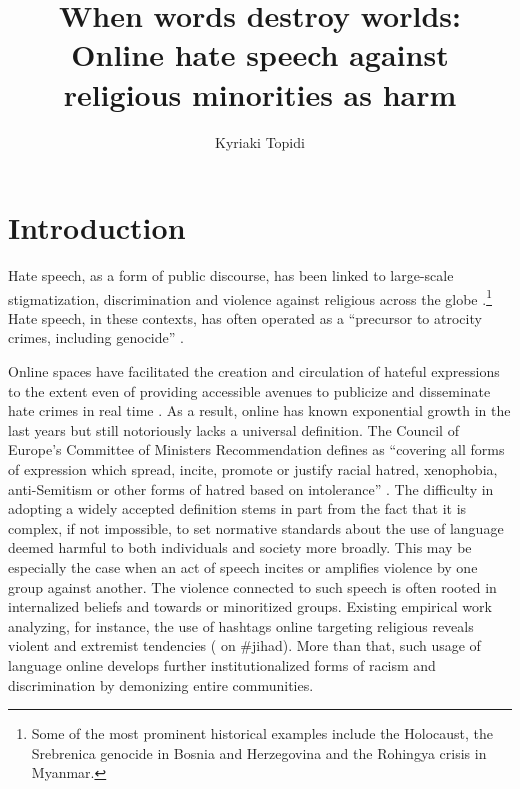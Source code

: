 \documentclass[output=paper,colorlinks,citecolor=brown]{langscibook}
\author{Kyriaki Topidi\orcid{}\affiliation{}}
\title[When words destroy worlds]{When words destroy worlds: Online hate speech against religious minorities as harm}
\begin{document}
\maketitle


\section{Introduction}\label{ch.1.2.ss.1}

Hate speech, as a form of public discourse, has been linked to large-scale stigmatization, discrimination and violence against religious  across the globe \citep{un2023}.\footnote{%
Some of the most prominent historical examples include the Holocaust, the Srebrenica genocide in Bosnia and Herzegovina and the Rohingya crisis in Myanmar.} Hate speech, in these contexts, has often operated as a ``precursor to atrocity crimes, including genocide'' \citep{un2023}.

Online spaces have facilitated the creation and circulation of hateful expressions to the extent even of providing accessible avenues to publicize and disseminate hate crimes in real time \citep{laub2019}. As a result,  online has known exponential growth in the last years but still notoriously lacks a universal definition. The Council of Europe's Committee of Ministers Recommendation defines  as ``covering all forms of expression which spread, incite, promote or justify racial hatred, xenophobia, anti-Semitism or other forms of hatred based on intolerance'' \citep{coe1997hatespeech}. The difficulty in adopting a widely accepted definition stems in part from the fact that it is complex, if not impossible, to set normative standards about the use of language deemed harmful to both individuals and society more broadly. This may be especially the case when an act of speech incites or amplifies violence by one group against another. The violence connected to such speech is often rooted in internalized beliefs and  towards  or minoritized groups. Existing empirical work analyzing, for instance, the use of hashtags online targeting religious  reveals violent and extremist tendencies (\citealt{aguilera-carnero_azeez2016} on \#jihad). More than that, such usage of language online develops further institutionalized forms of racism and discrimination by demonizing entire communities.
\end{document}

